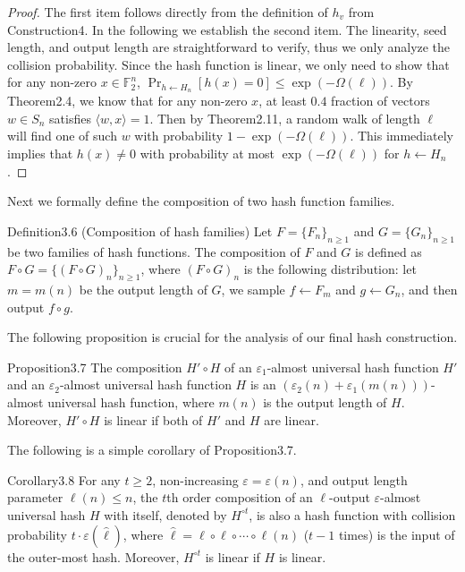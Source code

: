 \begin{proof}
The first item follows directly from the definition of $h_v$ from Construction4. In the following we establish the second item.
The linearity, seed length, and output length are straightforward to verify, thus we only analyze the collision probability. Since the hash function is linear, we only need to show that for any non-zero $x\in\mathbb F_2^n$, $\Pr_{h\leftarrow H_n}[h(x)=0]\le\exp(-\Omega(\ell))$. By Theorem2.4, we know that for any non-zero $x$, at least $0.4$ fraction of vectors $w\in S_n$ satisfies $\langle w,x\rangle=1$. Then by Theorem2.11, a random walk of length $\ell$ will find one of such $w$ with probability $1-\exp(-\Omega(\ell))$. This immediately implies that $h(x)\ne0$ with probability at most $\exp(-\Omega(\ell))$ for $h\leftarrow H_n$.
\end{proof}
Next we formally define the composition of two hash function families.
\begin{authorclaim}{Definition3.6 (Composition of hash families)}
Let $F=\{F_n\}_{n\ge1}$ and $G=\{G_n\}_{n\ge1}$ be two families of hash functions. The composition of $F$ and $G$ is defined as $F\circ G=\{(F\circ G)_n\}_{n\ge1}$, where $(F\circ G)_n$ is the following distribution: let $m=m(n)$ be the output length of $G$, we sample $f\leftarrow F_m$ and $g\leftarrow G_n$, and then output $f\circ g$.
\end{authorclaim}
The following proposition is crucial for the analysis of our final hash construction.
\begin{authorclaim}{Proposition3.7}
The composition $H'\circ H$ of an $\varepsilon_1$-almost universal hash function $H'$ and an $\varepsilon_2$-almost universal hash function $H$ is an $(\varepsilon_2(n)+\varepsilon_1(m(n)))$-almost universal hash function, where $m(n)$ is the output length of $H$. Moreover, $H'\circ H$ is linear if both of $H'$ and $H$ are linear.
\end{authorclaim}
The following is a simple corollary of Proposition3.7.
\begin{authorclaim}{Corollary3.8}
For any $t\ge2$, non-increasing $\varepsilon=\varepsilon(n)$, and output length parameter $\ell(n)\le n$, the $t$th order composition of an $\ell$-output $\varepsilon$-almost universal hash $H$ with itself, denoted by $H^{\circ t}$, is also a hash function with collision probability $t\cdot\varepsilon(\hat\ell)$, where $\hat\ell=\ell\circ\ell\circ\cdots\circ\ell(n)$ ($t-1$ times) is the input of the outer-most hash. Moreover, $H^{\circ t}$ is linear if $H$ is linear.
\end{authorclaim}
